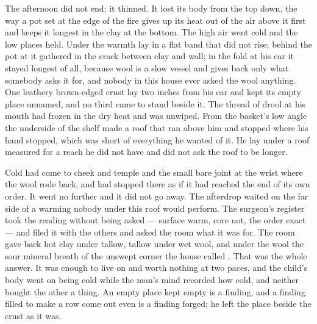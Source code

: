 The afternoon did not end; it thinned. It lost its body from the top down, the way a pot set at the edge of the fire gives up its heat out of the air above it first and keeps it longest in the clay at the bottom. The high air went cold and the low places held. Under  the warmth lay in a flat band that did not rise; behind the pot at  it gathered in the crack between clay and wall; in the fold at his ear it stayed longest of all, because wool is a slow vessel and gives back only what somebody asks it for, and nobody in this house ever asked the wool anything. One leathery brown-edged crust lay two inches from his ear and kept its empty place unnamed, and no third came to stand beside it. The thread of drool at his mouth had frozen in the dry heat and was unwiped. From the basket's low angle the underside of the shelf made a roof that ran above him and stopped where his hand stopped, which was short of everything he wanted of it. He lay under a roof measured for a reach he did not have and did not ask the roof to be longer.

Cold had come to cheek and temple and the small bare joint at the wrist where the wool rode back, and had stopped there as if it had reached the end of its own order. It went no further and it did not go away. The afterdrop waited on the far side of a warming nobody under this roof would perform. The surgeon's register took the reading without being asked --- surface warm, core not, the order exact --- and filed it with the others and asked the room what it was for. The room gave back hot clay under tallow, tallow under wet wool, and under the wool the sour mineral breath of the unswept corner the house called . That was the whole answer. It was enough to live on and worth nothing at two paces, and the child's body went on being cold while the man's mind recorded how cold, and neither bought the other a thing. An empty place kept empty is a finding, and a finding filled to make a row come out even is a finding forged; he left the place beside the crust as it was.

\scenebreak

